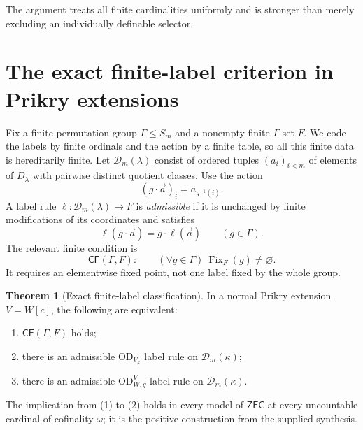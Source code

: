 \documentclass[11pt,letterpaper]{article}
\theoremstyle{definition}
\newtheorem{theorem}[definition]{Theorem}
\numberwithin{equation}{section}
\newcommand{\ZFC}{\mathsf{ZFC}}
\newcommand{\OD}{\mathrm{OD}}
\newcommand{\CF}{\mathsf{CF}}
\newcommand{\fix}{\operatorname{Fix}}
\newcommand{\ODW}{\OD^{V}_{W,q}}
\begin{document}
The argument treats all finite cardinalities uniformly and is stronger than merely excluding an individually definable selector.

\section{The exact finite-label criterion in Prikry extensions}\label{sec:labels}

Fix a finite permutation group $\Gamma\leq S_m$ and a nonempty finite $\Gamma$-set $F$. We code the labels by finite ordinals and the action by a finite table, so all this finite data is hereditarily finite. Let $\mathcal D_m(\lambda)$ consist of ordered tuples $(a_i)_{i<m}$ of elements of $D_\lambda$ with pairwise distinct quotient classes. Use the action
\[
(g\cdot\vec a)_i=a_{g^{-1}(i)}.
\]
A label rule $\ell:\mathcal D_m(\lambda)\to F$ is \emph{admissible} if it is unchanged by finite modifications of its coordinates and satisfies
\[
\ell(g\cdot\vec a)=g\cdot\ell(\vec a)\qquad(g\in\Gamma).
\]
The relevant finite condition is
\begin{equation}\label{eq:CF}
\CF(\Gamma,F):\qquad (\forall g\in\Gamma)\ \fix_F(g)\ne\varnothing.
\end{equation}
It requires an elementwise fixed point, not one label fixed by the whole group.

\begin{theorem}[Exact finite-label classification]\label{thm:classification}
In a normal Prikry extension $V=W[c]$, the following are equivalent:
\begin{enumerate}
\item $\CF(\Gamma,F)$ holds;
\item there is an admissible $\OD_{V_\kappa}$ label rule on $\mathcal D_m(\kappa)$;
\item there is an admissible $\ODW$ label rule on $\mathcal D_m(\kappa)$.
\end{enumerate}
The implication from (1) to (2) holds in every model of $\ZFC$ at every uncountable cardinal of cofinality $\omega$; it is the positive construction from the supplied synthesis.
\end{theorem}
\end{document}
